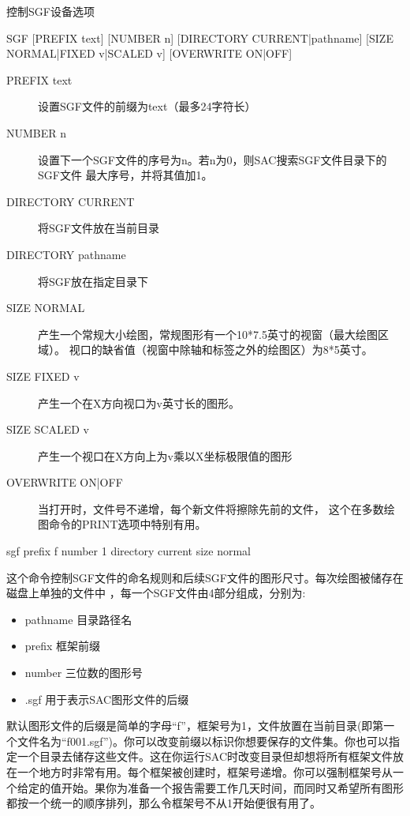 \label{cmd:sgf}

控制SGF设备选项

\begin{SACSTX}
SGF [PREFIX text] [NUMBER n] [DIRECTORY CURRENT|pathname]
    [SIZE NORMAL|FIXED v|SCALED v] [OVERWRITE ON|OFF]
\end{SACSTX}

\begin{description}
\item [PREFIX text] 设置SGF文件的前缀为text（最多24字符长）
\item [NUMBER n] 设置下一个SGF文件的序号为n。若n为0，则SAC搜索SGF文件目录下的SGF文件
    最大序号，并将其值加1。
\item [DIRECTORY CURRENT] 将SGF文件放在当前目录
\item [DIRECTORY pathname] 将SGF放在指定目录下
\item [SIZE NORMAL] 产生一个常规大小绘图，常规图形有一个10*7.5英寸的视窗（最大绘图区域）。
    视口的缺省值（视窗中除轴和标签之外的绘图区）为8*5英寸。
\item [SIZE FIXED v] 产生一个在X方向视口为v英寸长的图形。
\item [SIZE SCALED v] 产生一个视口在X方向上为v乘以X坐标极限值的图形
\item [OVERWRITE ON|OFF] 当打开时，文件号不递增，每个新文件将擦除先前的文件，
    这个在多数绘图命令的PRINT选项中特别有用。
\end{description}

\begin{SACDFT}
sgf prefix f number 1 directory current size normal
\end{SACDFT}

这个命令控制SGF文件的命名规则和后续SGF文件的图形尺寸。每次绘图被储存在磁盘上单独的文件中
，每一个SGF文件由4部分组成，分别为:
\begin{itemize}
\item pathname 目录路径名
\item prefix 框架前缀
\item number 三位数的图形号
\item .sgf 用于表示SAC图形文件的后缀
\end{itemize}

默认图形文件的后缀是简单的字母``f''，框架号为1，文件放置在当前目录(即第一个文件名为``f001.sgf'')。你可以改变前缀以标识你想要保存的文件集。你也可以指定一个目录去储存这些文件。这在你运行SAC时改变目录但却想将所有框架文件放在一个地方时非常有用。每个框架被创建时，框架号递增。你可以强制框架号从一个给定的值开始。果你为准备一个报告需要工作几天时间，而同时又希望所有图形都按一个统一的顺序排列，那么令框架号不从1开始便很有用了。

